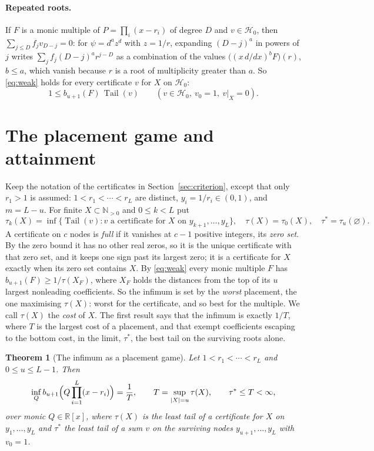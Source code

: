 \documentclass[11pt]{article}
\newtheorem{theorem}{Theorem}[section]
\theoremstyle{definition}
\theoremstyle{plain}
\newcommand{\R}{\mathbb R}
\newcommand{\N}{\mathbb N}
\DeclareMathOperator{\Tail}{Tail}
\begin{document}
\paragraph{Repeated roots.}  If $F$ is a monic
multiple of $P=\prod_i(x-r_i)$ of degree $D$ and $v\in\mathcal H_0$, then
$\sum_{j\le D}f_jv_{D-j}=0$: for $\psi=d^az^d$ with $z=1/r$, expanding
$(D-j)^a$ in powers of $j$ writes $\sum_jf_j(D-j)^ar^{j-D}$ as a combination
of the values $\bigl((x\,d/dx)^bF\bigr)(r)$, $b\le a$, which vanish because
$r$ is a root of multiplicity greater than $a$.
So \eqref{eq:weak} holds for every certificate $v$ for $X$ on
$\mathcal H_0$:
\begin{equation}\label{eq:weakrep}
  1\le b_{u+1}(F)\,\Tail(v)\qquad(v\in\mathcal H_0,\ v_0=1,\ v|_X=0).
\end{equation}

\section{The placement game and attainment}\label{sec:value}

Keep the notation of the certificates in
Section~\ref{sec:criterion}, except that only $r_1>1$ is assumed: $1<r_1<\cdots<r_L$
are distinct, $y_i=1/r_i\in(0,1)$, and $m=L-u$.  For finite $X\subset\N_{>0}$ and
$0\le k<L$ put
\[
  \tau_k(X)=\inf\bigl\{\Tail(v):v\text{ a certificate for }X\text{ on }
  y_{k+1},\ldots,y_L\bigr\},
  \quad \tau(X)=\tau_0(X),\quad \tau^*=\tau_u(\varnothing).
\]
A certificate on $c$ nodes is \emph{full} if it vanishes at $c-1$ positive
integers, its \emph{zero set}.  By the zero bound it has no other real zeros,
so it is the unique certificate with that zero set, and it keeps one sign
past its largest zero; it is a certificate for $X$ exactly when its zero set
contains $X$.  By \eqref{eq:weak} every monic multiple $F$ has
$b_{u+1}(F)\ge1/\tau(X_F)$, where $X_F$ holds the distances from the top of
its $u$ largest nonleading coefficients.  So the infimum is set by the \emph{worst}
placement, the one maximising $\tau(X)$: worst for the certificate, and so
best for the multiple.  We call $\tau(X)$ the \emph{cost} of $X$.  The
first result says that the infimum is exactly $1/T$, where $T$ is the largest
cost of a placement, and that exempt coefficients escaping to the bottom
cost, in the limit, $\tau^*$, the best tail on the surviving roots alone.

\begin{theorem}[The infimum as a placement game]\label{thm:value}
Let $1<r_1<\cdots<r_L$ and $0\le u\le L-1$.  Then
\[
  \inf_Qb_{u+1}\Bigl(Q\prod_{i=1}^L(x-r_i)\Bigr)=\frac1T,
  \qquad T=\sup_{|X|=u}\tau(X),\qquad \tau^*\le T<\infty,
\]
over monic $Q\in\R[x]$, where $\tau(X)$ is the least tail of a certificate
for $X$ on $y_1,\ldots,y_L$ and $\tau^*$ the least tail of a sum $v$ on the
surviving nodes $y_{u+1},\ldots,y_L$ with $v_0=1$.
\end{theorem}
\end{document}
